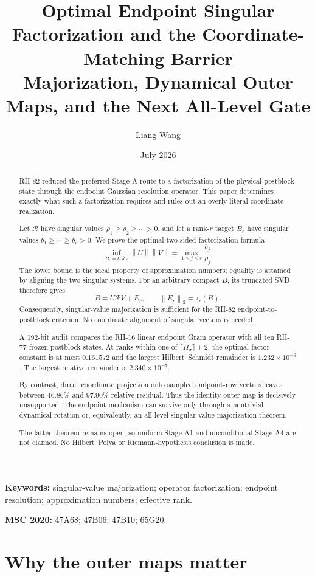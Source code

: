 \documentclass[11pt]{article}
\title{Optimal Endpoint Singular Factorization and the Coordinate-Matching Barrier\\
\large Majorization, Dynamical Outer Maps, and the Next All-Level Gate}
\author{Liang Wang}
\date{July 2026}
\theoremstyle{remark}
\newcommand{\norm}[1]{\left\lVert#1\right\rVert}
\newcommand{\cR}{\mathcal R}
\begin{document}
\maketitle

\begin{abstract}
RH-82 reduced the preferred Stage-A route to a factorization of the physical
postblock state through the endpoint Gaussian resolution operator.  This
paper determines exactly what such a factorization requires and rules out an
overly literal coordinate realization.

Let $\cR$ have singular values $\rho_1\ge\rho_2\ge\cdots>0$, and let a
rank-$r$ target $B_r$ have singular values $b_1\ge\cdots\ge b_r>0$.  We prove
the optimal two-sided factorization formula
\[
 \inf_{B_r=U\cR V}\norm U\norm V
 =\max_{1\le j\le r}\frac{b_j}{\rho_j}.
\]
The lower bound is the ideal property of approximation numbers; equality is
attained by aligning the two singular systems.  For an arbitrary compact
$B$, its truncated SVD therefore gives
\[
 B=U\cR V+E_r,
 \qquad \norm{E_r}_2=\tau_r(B).
\]
Consequently, singular-value majorization is sufficient for the RH-82
endpoint-to-postblock criterion.  No coordinate alignment of singular vectors
is needed.

A 192-bit audit compares the RH-16 linear endpoint Gram operator with all ten
RH-77 frozen postblock states.  At ranks within one of
$\lceil H_\sigma\rceil+2$, the optimal factor constant is at most $0.161572$
and the largest Hilbert--Schmidt remainder is $1.232\times10^{-9}$.  The
largest relative remainder is $2.340\times10^{-7}$.

By contrast, direct coordinate projection onto sampled endpoint-row vectors
leaves between $46.86\%$ and $97.90\%$ relative residual.  Thus the identity
outer map is decisively unsupported.  The endpoint mechanism can survive only
through a nontrivial dynamical rotation or, equivalently, an all-level
singular-value majorization theorem.

The latter theorem remains open, so uniform Stage A1 and unconditional Stage
A4 are not claimed.  No Hilbert--Polya or Riemann-hypothesis conclusion is
made.
\end{abstract}

\noindent\textbf{Keywords:} singular-value majorization; operator
factorization; endpoint resolution; approximation numbers; effective rank.

\medskip
\noindent\textbf{MSC 2020:} 47A68; 47B06; 47B10; 65G20.

\section{Why the outer maps matter}
\end{document}
